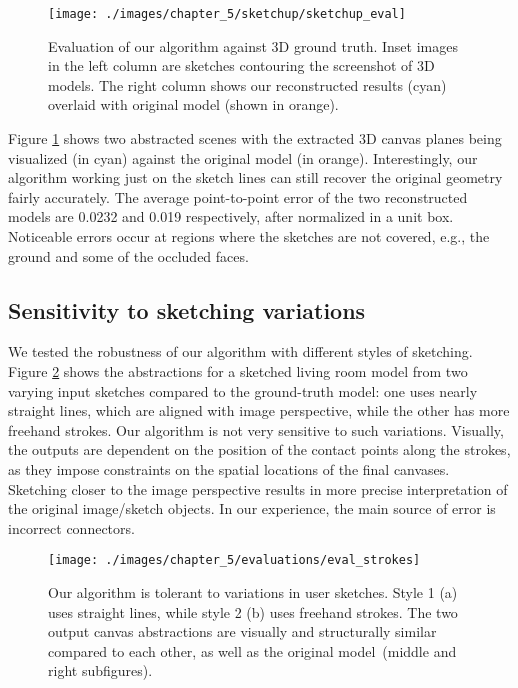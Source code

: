 {\begin{figure}[t!]
  \texttt{[image: ./images/chapter\_5/sketchup/sketchup\_eval]}
  \caption{Evaluation of our algorithm against 3D ground truth. Inset images in the left column are sketches contouring the screenshot of 3{D} models. The right column shows our reconstructed results (cyan) overlaid with original model (shown in orange).}
  \label{fig:sketchupEval}
  \vnudge
\end{figure}


Figure \ref{fig:sketchupEval} shows two abstracted scenes with the extracted 3D canvas planes being visualized (in cyan) against the original model (in orange). Interestingly, our algorithm working just on the sketch lines can still recover the original geometry fairly accurately. The average point-to-point error of the two reconstructed models are 0.0232 and 0.019 respectively, after normalized in a unit box.
Noticeable errors occur at regions where the sketches are not covered, e.g., the ground and some of the occluded faces.



\subsection{Sensitivity to sketching variations}  We tested the robustness of our algorithm with different styles of sketching. Figure \ref{fig:strokes_eval} shows the abstractions for a sketched living room model from two varying input sketches compared to the ground-truth model: one uses nearly straight lines, which are aligned with image perspective, while the other has more freehand strokes. Our algorithm is not very sensitive to such variations. Visually, the outputs are dependent on the position of the contact points along the strokes, as they impose constraints on the spatial locations of the final canvases. Sketching closer to the image perspective results in more precise interpretation of the original image/sketch objects.
%
In our experience, the main source of error is incorrect connectors.%

\begin{figure}[h!]
  \centering
  \texttt{[image: ./images/chapter\_5/evaluations/eval\_strokes]}
  \caption{Our algorithm is tolerant to variations in user sketches. Style 1 (a) uses straight lines, while style 2 (b) uses freehand strokes. The two output canvas abstractions are visually and structurally similar compared to each other, as well as the original model~(middle and right subfigures).
  }
  \label{fig:strokes_eval}
  \vnudge
\end{figure}

}
